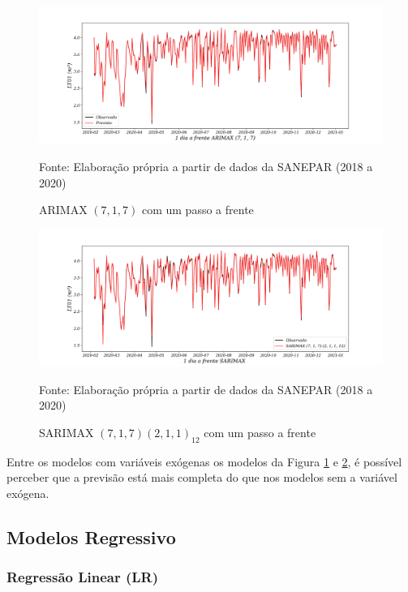 \begin{figure}[H]
	\centering
	\caption{ARIMAX $(7,1,7)$ com um passo a frente}
	\label{fig:1-arimax}
	\includegraphics[width=1\linewidth]{Modelos/Figuras/1-ARIMAX}
	
	Fonte: Elaboração própria a partir de dados da SANEPAR (2018 a 2020)
\end{figure}

\begin{figure}[H]
	\centering
	\caption{SARIMAX $(7,1,7) (2,1,1)_{12}$ com um passo a frente}
	\label{fig:1-sarimax}
	\includegraphics[width=1\linewidth]{Modelos/Figuras/1-SARIMAX}
	
	Fonte: Elaboração própria a partir de dados da SANEPAR (2018 a 2020)
\end{figure}


Entre os modelos com variáveis exógenas os modelos da Figura \ref{fig:1-arimax} e \ref{fig:1-sarimax}, é possível perceber que a previsão está mais completa do que nos modelos sem a variável exógena.

\subsection{Modelos Regressivo}\label{subsec:reg}

\subsubsection{Regressão Linear (LR)}

